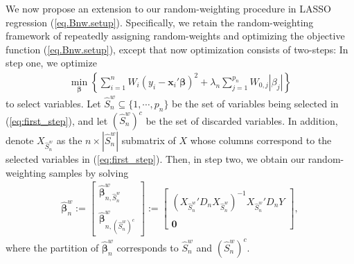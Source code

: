 \documentclass[ejs,authoryear,linksfromyear]{imsart}
\newcommand{\sumin}{\sum_{i=1}^n} %
\newcommand{\bnw}{\widehat{\bm{\beta}}_n^w} %
\numberwithin{equation}{section}
\theoremstyle{plain}
\begin{document}
We now propose an extension to our random-weighting procedure in LASSO regression (\ref{eq.Bnw.setup}). Specifically, we retain the random-weighting framework of repeatedly assigning random-weights and optimizing the objective function (\ref{eq.Bnw.setup}), except that now optimization consists of two-steps: In step one, we optimize 
\begin{align} \label{eq:first_step}
\min_{\bm{\beta}}
\left\{
\sumin W_i ( y_i - \bm{x}_i' \bm{\beta} )^2 
+ \lambda_n \sum_{j=1}^{p_n} W_{0,j} |\beta_j|
\right\}
\end{align}
to select variables. Let $\widehat{S}_n^w \subseteq \{1, \cdots, p_n\}$ be the set of variables being selected in (\ref{eq:first_step}), and let $(\widehat{S}_n^w)^c$ be the set of discarded variables. In addition, denote $X_{\widehat{S}_n^w}$ as the $n \times | \widehat{S}_n^w  |$ submatrix of $X$ whose columns correspond to the selected variables in (\ref{eq:first_step}). Then, in step two, we obtain our random-weighting samples by solving 
\begin{align} \label{eq:second_step}
\bnw := 
\begin{bmatrix}
	\widehat{\bm{\beta}}^w_{n, \widehat{S}_n^w} \\
	\\
	\widehat{\bm{\beta}}^w_{n, (\widehat{S}_n^w)^c} 
\end{bmatrix}
:= 
\begin{bmatrix}
	\left(
		X_{\widehat{S}_n^w}' D_n X_{\widehat{S}_n^w} 
	\right)^{-1}
		X_{\widehat{S}_n^w}' D_n Y \\
	\\
	\bm{0}
\end{bmatrix},
\end{align}
where the partition of $\bnw$ corresponds to $\widehat{S}_n^w$ and $\left(\widehat{S}_n^w \right)^c$. 
\end{document}

